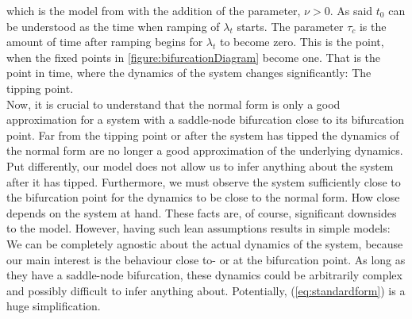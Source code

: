 which is the model from \cite[equation (2)]{Ditlevsen2023} with the addition of the parameter, $\nu>0$. As said $t_0$ can be understood as the time when ramping of $\lambda_t$ starts. The parameter $\tau_c$ is the amount of time after ramping begins for $\lambda_t$ to become zero. This is the point, when the fixed points in \ref{figure:bifurcationDiagram} become one. That is the point in time, where the dynamics of the system changes significantly: The tipping point. \\Now, it is crucial to understand that the normal form is only a good approximation for a system with a saddle-node bifurcation close to its bifurcation point. Far from the tipping point or after the system has tipped the dynamics of the normal form are no longer a good approximation of the underlying dynamics. Put differently, our model does not allow us to infer anything about the system after it has tipped. Furthermore, we must observe the system sufficiently close to the bifurcation point for the dynamics to be close to the normal form. How close depends on the system at hand. These facts are, of course, significant downsides to the model. However, having such lean assumptions results in simple models: We can be completely agnostic about the actual dynamics of the system, because our main interest is the behaviour close to- or at the bifurcation point. As long as they have a saddle-node bifurcation, these dynamics could be arbitrarily complex and possibly difficult to infer anything about. Potentially, (\ref{eq:standardform}) is a huge simplification.
